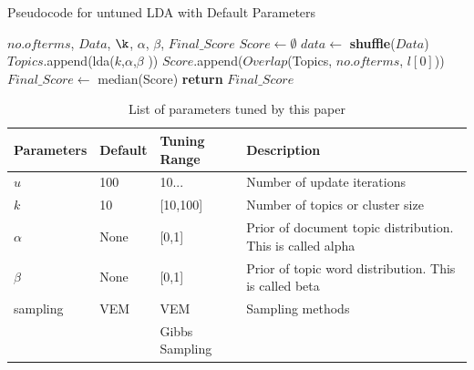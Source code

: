 \documentclass[10pt,conference]{IEEEtran}
\theoremstyle{break}
\begin{document}
\makeatletter
\algrenewcommand\ALG@beginalgorithmic{\footnotesize}
\algrenewcommand{}
\makeatother
\renewcommand{\algorithmicrequire}{\textbf{Input:}}
\renewcommand{\algorithmicensure}{\textbf{Output:}}
\begin{algorithm}[!htbp]
    \caption{Pseudocode for untuned LDA with Default Parameters}
    \begin{algorithmic}[1]
    \Require $no. of terms$, $Data$, $\k$, $\alpha$, $\beta$, 
    \Ensure $Final\_Score$    
        \State $Score \leftarrow \emptyset$
                \State $data \leftarrow$ \textbf{shuffle}($Data$)
                \State $Topics$.append(lda($k$,$\alpha$,$\beta$ ))
            \EndFor
            \State $Score$.append($Overlap$(Topics, $no. of terms$, $l[0]$))
        \EndFor
        \State $Final\_Score \leftarrow $ median(Score)
        \State \textbf{return} $Final\_Score$
    \EndFunction
    \end{algorithmic}
\end{algorithm}
\begin{table}[!htbp]
    \begin{center}
{\scriptsize
\begin{tabular}{|l|l|l|p{3.5cm}|}
        \hline 
        \textbf{Parameters} & \textbf{Default} & \textbf{Tuning Range} & \textbf{Description}\\
        \hline
        $u$ & 100 & 10... & Number of update iterations  \\
        \hline
        $k$ & 10 & [10,100] & Number of topics or cluster size \\ 
        \hline
       $\alpha$ & None & [0,1] & Prior of document topic distribution. This is called alpha \\ 
        \hline
        $\beta$ & None & [0,1] & Prior of topic word distribution. This is called  beta \\

        \hline
        sampling  & VEM & VEM    & Sampling methods \\
                  &     & Gibbs Sampling &\\
        \hline
\end{tabular}
}
\end{center}
\caption{List of parameters tuned by this paper}
\label{tb:tuned}
\end{table}
\end{document}
